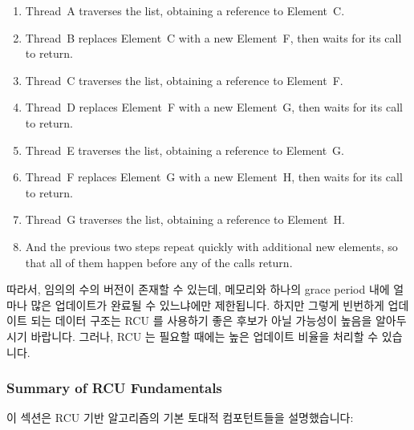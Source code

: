 {{\begin{enumerate}
	\item	Thread~A traverses the list, obtaining a reference to
		Element~C.
	\item	Thread~B replaces Element~C with a new
		Element~F, then waits for its 
		call to return.
	\item	Thread~C traverses the list, obtaining a reference to
		Element~F.
	\item	Thread~D replaces Element~F with a new
		Element~G, then waits for its 
		call to return.
	\item	Thread~E traverses the list, obtaining a reference to
		Element~G.
	\item	Thread~F replaces Element~G with a new
		Element~H, then waits for its 
		call to return.
	\item	Thread~G traverses the list, obtaining a reference to
		Element~H.
	\item	And the previous two steps repeat quickly with additional
		new elements, so that all of them happen before any of
		the  calls return.

	\fi

	\end{enumerate}

	따라서, 임의의 수의 버전이 존재할 수 있는데, 메모리와 하나의 grace
	period 내에 얼마나 많은 업데이트가 완료될 수 있느냐에만 제한됩니다.
	하지만 그렇게 빈번하게 업데이트 되는 데이터 구조는 RCU 를 사용하기 좋은
	후보가 아닐 가능성이 높음을 알아두시기 바랍니다.
	그러나, RCU 는 필요할 때에는 높은 업데이트 비율을 처리할 수 있습니다.

}\QuickQuizEndE
}

\subsubsection{Summary of RCU Fundamentals}
\label{sec:defer:Summary of RCU Fundamentals}

이 섹션은 RCU 기반 알고리즘의 기본 토대적 컴포턴트들을 설명했습니다:

